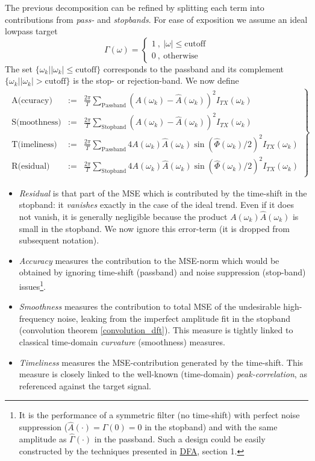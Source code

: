 \documentclass[a4paper]{book}
\begin{document}
The previous decomposition can be refined by splitting
each term into contributions from \emph{pass-} and \emph{stopbands}. For ease of exposition we assume an ideal lowpass target 
\[\Gamma(\omega)=\left\{\begin{array}{cc}1~,~|\omega|\leq\textrm{cutoff}\\0~,~\textrm{otherwise}\end{array}\right.\]
The set $\{\omega_k||\omega_k|\leq\textrm{cutoff}\}$ corresponds to the passband and its complement $\{\omega_k||\omega_k|>\textrm{cutoff}\}$ is the stop- or rejection-band. We now define
\begin{eqnarray}
\left.\begin{array}{ccc}
\textrm{A(ccuracy)}&:=&\frac{2\pi}{ T} \sum_{\textrm{Passband}} (A(\omega_k)-\hat{A}(\omega_k))^2 I_{TX}(\omega_k)\\
\textrm{S(moothness)}&:=&\frac{2\pi}{ T} \sum_{\textrm{Stopband}} (A(\omega_k)-\hat{A}(\omega_k))^2 I_{TX}(\omega_k)\\
\textrm{T(imeliness)}&:=&\frac{2\pi}{ T}  \sum_{\textrm{Passband}} 4A(\omega_k)\hat{A}(\omega_k)\sin(\hat{\Phi}(\omega_k)/2)^2
I_{TX}(\omega_k)                                     \\
\textrm{R(esidual)}&:=&\frac{2\pi}{ T}  \sum_{\textrm{Stopband}} 4A(\omega_k)\hat{A}(\omega_k)\sin(\hat{\Phi}(\omega_k)/2)^2
I_{TX}(\omega_k)
\end{array}\right\}\label{mse_dec_ats}
\end{eqnarray}
\begin{itemize}
\item \emph{Residual} is that part of the MSE which is contributed by the time-shift in the stopband: it \emph{vanishes} exactly in the case of the ideal trend.  Even if it does not vanish, it is generally negligible because the product $A(\omega_k)\hat{A}(\omega_k)$ is small in the stopband. We now ignore this error-term (it is dropped from subsequent notation).
\item \emph{Accuracy} measures the contribution to the MSE-norm which would be obtained by ignoring time-shift (passband) and noise suppression (stop-band) issues\footnote{It is the performance of a symmetric filter (no time-shift) with perfect noise suppression ($\hat{A}(\cdot)=\Gamma(0)=0$ in
the stopband) and with the same amplitude as $\hat{\Gamma}(\cdot)$ in the passband. Such a design could be easily constructed by
the techniques presented in \href{http://blog.zhaw.ch/sef/files/2014/10/DFA.pdf}{DFA}, section 1.}.
\item \emph{Smoothness} measures the contribution to total MSE of the undesirable high-frequency noise, leaking
from the imperfect amplitude fit in the stopband (convolution theorem \ref{convolution_dft}). This measure is tightly linked to classical time-domain \emph{curvature} (smoothness) measures.
\item \emph{Timeliness} measures the MSE-contribution generated by the time-shift. This measure is closely linked
to the well-known (time-domain) \emph{peak-correlation}, as referenced against the target signal.
\end{itemize}
\end{document}
